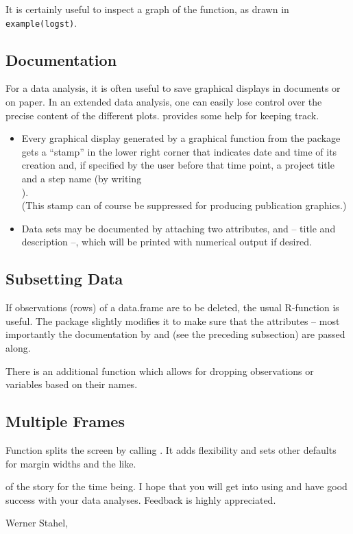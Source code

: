 \documentclass[11pt]{article}\usepackage[]{graphicx}\usepackage[]{color}
\begin{document}
It is certainly useful to inspect a graph of the function, as drawn in 
\texttt{example(logst)}.


\subsection{Documentation}
For a data analysis, it is often useful to save graphical displays in 
documents or on paper. In an extended data analysis, one can easily lose
control over the precise content of the different plots.
 provides some help for keeping track.
\begin{itemize}
\item 
  Every graphical display generated by a graphical function from the
  package gets a ``stamp'' in the lower right corner that indicates date
  and time of its creation and, if specified by the user before that 
  time point, a project title and a step name (by writing\\
  ).\\
  (This stamp can of course be suppressed for producing publication
  graphics.) 
\item
  Data sets may be documented by attaching two attributes,  and 
   -- title and description --, which will be printed with
  numerical output if desired.
\end{itemize}

\subsection{Subsetting Data}
If observations (rows) of a data.frame are to be deleted, the usual
R-function  is useful. The package slightly modifies it to make
sure that the attributes -- most importantly the documentation by
 and  (see the preceding subsection) are passed along.

There is an additional function  which allows for dropping
observations or variables based on their names.

\subsection{Multiple Frames}
Function  splits the screen by calling .
It adds flexibility and sets other defaults for margin widths and the like. 
\\[10mm]

{\small
{} of the story for the time being. I hope that you will
get into using  and have good success with your data analyses.
Feedback is highly appreciated.

Werner Stahel, 
}
\end{document}
